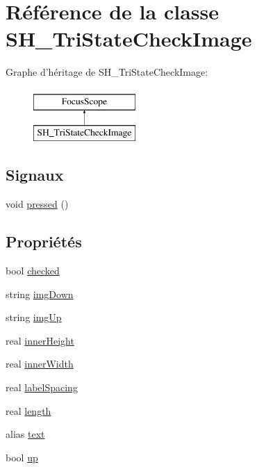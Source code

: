 \hypertarget{classSH__TriStateCheckImage}{\section{Référence de la classe S\-H\-\_\-\-Tri\-State\-Check\-Image}
\label{classSH__TriStateCheckImage}
}
Graphe d'héritage de S\-H\-\_\-\-Tri\-State\-Check\-Image\-:\begin{figure}[H]
\begin{center}
\leavevmode
\includegraphics[height=2.000000cm]{classSH__TriStateCheckImage}
\end{center}
\end{figure}
\subsection*{Signaux}
\begin{DoxyCompactItemize}
\item 
void \hyperlink{classSH__TriStateCheckImage_aad96452a92df7b35ed1cec9eebf6d2ba}{pressed} ()
\end{DoxyCompactItemize}
\subsection*{Propriétés}
\begin{DoxyCompactItemize}
\item 
bool \hyperlink{classSH__TriStateCheckImage_af51c5a98710ecd059fd02bd955443d4c}{checked}
\item 
string \hyperlink{classSH__TriStateCheckImage_a1dd7b1fbd15c10d427d72a9bd0d1e4d5}{img\-Down}
\item 
string \hyperlink{classSH__TriStateCheckImage_a94f6100793509e72d00079b4566a74f8}{img\-Up}
\item 
real \hyperlink{classSH__TriStateCheckImage_a4adf1659a5328f5e26243cd58f1d6ee7}{inner\-Height}
\item 
real \hyperlink{classSH__TriStateCheckImage_a34d45a4093bca7a689f72b1e9f4d8247}{inner\-Width}
\item 
real \hyperlink{classSH__TriStateCheckImage_afb0d31a1bf26dffbb2a186c82ab8e58d}{label\-Spacing}
\item 
real \hyperlink{classSH__TriStateCheckImage_aa4fa21a8c9124188a7ea87b4a922c617}{length}
\item 
alias \hyperlink{classSH__TriStateCheckImage_af1e4845c499b61447425538898cf9dbb}{text}
\item 
bool \hyperlink{classSH__TriStateCheckImage_a8a6a37f71149d3f918f642fa9d3e432c}{up}
\end{DoxyCompactItemize}


